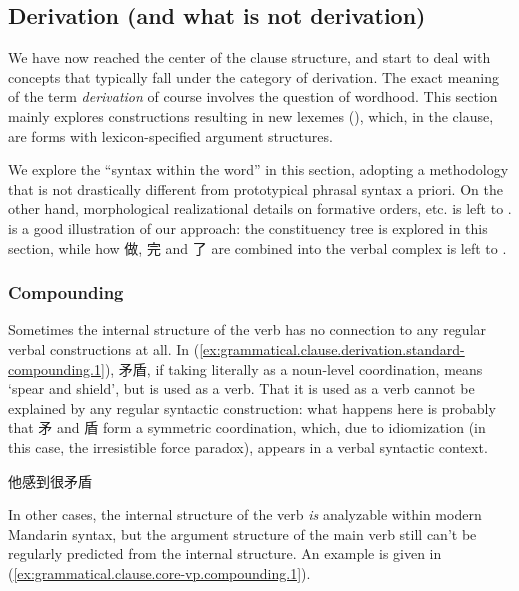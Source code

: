 \documentclass[UTF8, a4paper, oneside, scheme=plain, 12pt]{ctexrep}
\newcommand*{\term}[1]{\emph{#1}}
\newcommand{\translate}[1]{`#1'}
\begin{document}
\subsection{Derivation (and what is not derivation)}\label{sec:grammatical.clause.core-vp.derivation}

We have now reached the center of the clause structure,
and start to deal with concepts that typically fall under the category of derivation.
The exact meaning of the term \term{derivation} of course involves the question of wordhood.
This section mainly explores constructions resulting in new lexemes
(),
which, in the clause, are forms with lexicon-specified argument structures.

We explore the ``syntax within the word'' in this section,
adopting a methodology that is not drastically different from prototypical phrasal syntax a priori.
On the other hand, morphological realizational details on formative orders, etc. is left to .
 is a good illustration of our approach:
the constituency tree is explored in this section,
while how 做, 完 and 了 are combined into the verbal complex is left to .

\subsubsection{Compounding}\label{sec:grammatical.clause.core-vp.derivation.compounding}

Sometimes the internal structure of the verb has no connection to any regular verbal constructions at all.
In (\ref{ex:grammatical.clause.derivation.standard-compounding.1}),
矛盾, if taking literally as a noun-level coordination, means \translate{spear and shield},
but is used as a verb.
That it is used as a verb cannot be explained by any regular syntactic construction:
what happens here is probably that 矛 and 盾 form a symmetric coordination,
which, due to idiomization (in this case, the irresistible force paradox),
appears in a verbal syntactic context.

\begin{exe}
    \ex\label{ex:grammatical.clause.derivation.standard-compounding.1} 他感到很矛盾
\end{exe}

In other cases, the internal structure of the verb \emph{is} analyzable within modern Mandarin syntax,
but the argument structure of the main verb still can't
be regularly predicted from the internal structure.
An example is given in (\ref{ex:grammatical.clause.core-vp.compounding.1}).
\end{document}
